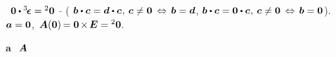 %
~${\zerovector \dotp \permutationsparitytensor = \zerobivalent}$
\textcolor{magenta}{
\dotproductinquotes\hbox{-}}
(%
${\bm{b} \dotp \bm{c} = \bm{d} \dotp \bm{c} \hspace{.1ex} , \hspace{.2em} \bm{c} \neq \zerovector
\hspace{.2em} \Leftrightarrow \hspace{.15em}
\bm{b} = \bm{d} }$,
${\bm{b} \dotp \bm{c} = \zerovector \dotp \bm{c} \hspace{.1ex} , \hspace{.2em} \bm{c} \neq \zerovector
\hspace{.2em} \Leftrightarrow \hspace{.15em}
\bm{b} = \zerovector }$).
~${\bm{a} = {\bm{0}}}$,
${\hspace{.2ex} \bm{A}({\bm{0}}) \hspace{-0.2ex} = {\bm{0}} \hspace{-0.2ex} \times \hspace{-0.2ex} \bm{E} = {^2\bm{0}}}$.

\begin{center}
\pmb{\checkmark} $\bm{a}$  ~${\hspace{-0.2ex}\bm{A}}$
\end{center}


